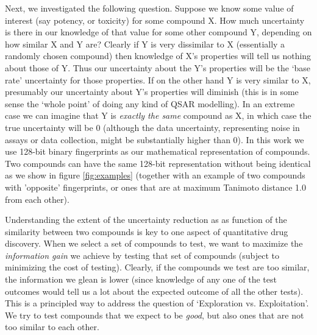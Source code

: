 \documentclass[journal=jacsat,manuscript=article]{achemso}
\begin{document}
Next, we investigated the following question. Suppose we know some value of interest (say potency, or toxicity) for some compound X.  How much uncertainty is there in our knowledge of that value for some other compound Y, depending on how similar X and Y are?
\newline
\newline
Clearly if Y is very dissimilar to X (essentially a randomly chosen compound) then knowledge of X's properties will tell us nothing about those of Y. Thus our uncertainty about the Y's properties will be the `base rate' uncertainty for those properties. If on the other hand Y is very similar to X, presumably our uncertainty about Y's properties will diminish (this is in some sense the `whole point' of doing any kind of QSAR modelling).  In an extreme case we can imagine that Y is \textit{exactly the same} compound as X, in which case the true uncertainty will be 0 (although the data uncertainty, representing noise in assays or data collection, might be substantially higher than 0).  In this work we use 128-bit binary fingerprints as our mathematical representation of compounds.  Two compounds can have the same 128-bit representation without being identical as we show in figure \ref{fig:examples} (together with an example of two compounds with 'opposite' fingerprints, or ones that are at maximum Tanimoto distance 1.0 from each other).


Understanding the extent of the uncertainty reduction as as function of the similarity between two compounds is key to one aspect of quantitative drug discovery.  When we select a set of compounds to test, we want to maximize the \textit{information gain} we achieve by testing that set of compounds (subject to minimizing the cost of testing).  Clearly, if the compounds we test are too similar, the information we glean is lower (since knowledge of any one of the test outcomes would tell us a lot about the expected outcome of all the other tests).  This is a principled way to address the question of `Exploration vs. Exploitation'.  We try to test compounds that we expect to be \textit{good}, but also ones that are not too similar to each other.
\end{document}
